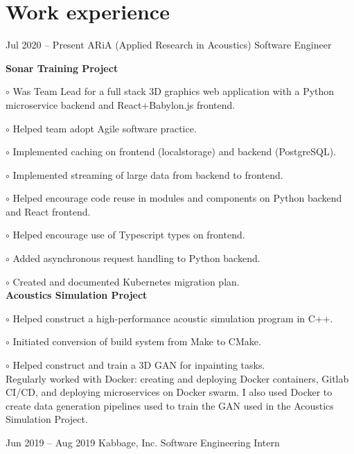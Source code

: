 \documentclass[fontsize=11pt]{tccv}
\begin{document}
\section{Work experience}
\begin{eventlist}

\item{Jul 2020 -- Present}
     {ARiA (Applied Research in Acoustics)}
     {Software Engineer}
     
    { \setlength\parindent{24pt}
        \textbf{Sonar Training Project}

        $\circ$ Was Team Lead for a full stack 3D graphics web application with a Python microservice backend and React+Babylon.js frontend.
        
        $\circ$ Helped team adopt Agile software practice.
        
        $\circ$ Implemented caching on frontend (localstorage) and backend (PostgreSQL).
        
        $\circ$ Implemented streaming of large data from backend to frontend.
        
        $\circ$ Helped encourage code reuse in modules and components on Python backend and React frontend.
        
        $\circ$ Helped encourage use of Typescript types on frontend.
        
        $\circ$ Added asynchronous request handling to Python backend.
        
        $\circ$ Created and documented Kubernetes migration plan.
         \\
        
        \textbf{Acoustics Simulation Project}
        
        $\circ$ Helped construct a high-performance acoustic simulation program in C++.
        
        $\circ$ Initiated conversion of build system from Make to CMake.
        
        $\circ$ Helped construct and train a 3D GAN for inpainting tasks.
        \\
        
        Regularly worked with Docker: creating and deploying Docker containers, Gitlab CI/CD, and deploying microservices on Docker swarm. I also used Docker to create data generation pipelines used to train the GAN used in the Acoustics Simulation Project.
    }
     
\item{Jun 2019 -- Aug 2019}
     {Kabbage, Inc.}
     {Software Engineering Intern}
     

\end{eventlist}
\end{document}
